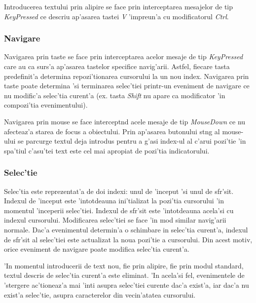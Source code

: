 \medskip

Introducerea textului prin alipire se face prin interceptarea mesajelor de tip \emph{\emph{KeyPressed}} ce descriu ap'asarea tastei \emph{V} 'impreun'a cu modificatorul \emph{Ctrl}.

\subsubsection{Navigare}

Navigarea prin taste se face prin interceptarea acelor mesaje de tip \emph{\emph{KeyPressed}} care au ca surs'a ap'asarea tastelor specifice navig'arii. Astfel, fiecare tasta predefinit'a determina repozi'tionarea cursorului la un nou index. Navigarea prin taste poate determina 'si terminarea selec'tiei printr-un eveniment de navigare ce nu modific'a selec'tia curent'a (ex. tasta \emph{Shift} nu apare ca modificator 'in compozi'tia evenimentului).

\medskip

Navigarea prin mouse se face intercept{\ia}nd acele mesaje de tip \emph{MouseDown} ce nu afecteaz'a starea de focus a obiectului. Prin ap'asarea butonului st{\ia}ng al mouse-ului se parcurge textul deja introdus pentru a g'asi index-ul al c'arui pozi'tie 'in spa'tiul c'asu'tei text este cel mai apropiat de pozi'tia indicatorului.

\subsubsection{Selec'tie}

Selec'tia este reprezentat'a de doi indexi: unul de 'inceput 'si unul de sf{\ia}r'sit. Indexul de 'inceput este 'intotdeauna ini'tializat la pozi'tia cursorului 'in momentul 'inceperii selec'tiei. Indexul de sf{\ia}r'sit este 'intotdeauna acela'si cu indexul cursorului. Modificarea selec'tiei se face 'in mod similar navig'arii normale. Dac'a evenimentul determin'a o schimbare in selec'tia curent'a, indexul de sf{\ia}r'sit al selec'tiei este actualizat la noua pozi'tie a cursorului. Din acest motiv, orice eveniment de navigare poate modifica selec'tia curent'a.

\medskip

'In momentul introducerii de text nou, fie prin alipire, fie prin modul standard, textul descris de selec'tia curent'a este eliminat. 'In acela'si fel, evenimentele de 'stergere ac'tioneaz'a mai 'int{\ia}i asupra selec'tiei curente dac'a exist'a, iar dac'a nu exist'a selec'tie, asupra caracterelor din vecin'atatea cursorului.

